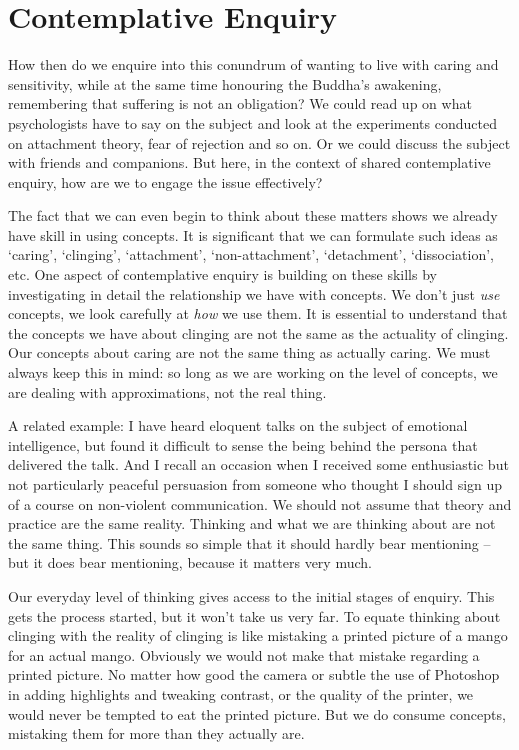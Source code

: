 \section{Contemplative Enquiry}

How then do we enquire into this conundrum of wanting to live with
caring and sensitivity, while at the same time honouring the Buddha’s
awakening, remembering that suffering is not an obligation? We could
read up on what psychologists have to say on the subject and look at the
experiments conducted on attachment theory, fear of rejection and so on.
Or we could discuss the subject with friends and companions. But here,
in the context of shared contemplative enquiry, how are we to engage the
issue effectively?

The fact that we can even begin to think about these matters shows we
already have skill in using concepts. It is significant that we can
formulate such ideas as ‘caring’, ‘clinging’, ‘attachment’,
‘non-attachment’, ‘detachment’, ‘dissociation’, etc. One aspect of
contemplative enquiry is building on these skills by investigating in
detail the relationship we have with concepts. We don’t just \emph{use}
concepts, we look carefully at \emph{how} we use them. It is essential to
understand that the concepts we have about clinging are not the same as
the actuality of clinging. Our concepts about caring are not the same
thing as actually caring. We must always keep this in mind: so long as
we are working on the level of concepts, we are dealing with
approximations, not the real thing.

A related example: I have heard eloquent talks on the subject of
emotional intelligence, but found it difficult to sense the being behind
the persona that delivered the talk. And I recall an occasion when I
received some enthusiastic but not particularly peaceful persuasion from
someone who thought I should sign up of a course on non-violent
communication. We should not assume that theory and practice are the
same reality. Thinking and what we are thinking about are not the same
thing. This sounds so simple that it should hardly bear mentioning – but
it does bear mentioning, because it matters very much.

Our everyday level of thinking gives access to the initial stages of
enquiry. This gets the process started, but it won’t take us very far.
To equate thinking about clinging with the reality of clinging is like
mistaking a printed picture of a mango for an actual mango. Obviously we
would not make that mistake regarding a printed picture. No matter how
good the camera or subtle the use of Photoshop in adding highlights and
tweaking contrast, or the quality of the printer, we would never be
tempted to eat the printed picture. But we do consume concepts,
mistaking them for more than they actually are.

